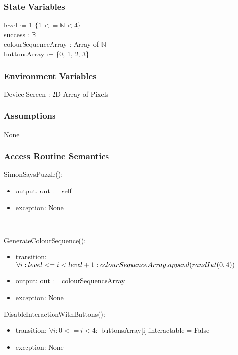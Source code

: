 \documentclass[12pt, titlepage]{article}
\begin{document}
\subsubsection{State Variables}
level := 1 $\{1<=\mathbb{N}<4\}$\\
success : $\mathds{B}$\\
colourSequenceArray : Array of $\mathds{N}$\\
buttonsArray := \{0, 1, 2, 3\}\\

\subsubsection{Environment Variables}

Device Screen : 2D Array of Pixels

\subsubsection{Assumptions}

None

\subsubsection{Access Routine Semantics}

\noindent SimonSaysPuzzle():
\begin{itemize}
\item output: out := self
\item exception: None
\end{itemize}\

\noindent GenerateColourSequence():
\begin{itemize}
\item transition: $ \forall i: level <= i < level + 1 : \newline colourSequenceArray.append(randInt(0,4))$
\item output: out := colourSequenceArray
\item exception: None
\end{itemize}

\noindent DisableInteractionWithButtons():
\begin{itemize}
\item transition: $ \forall i: 0 <= i < 4 :$ \newline buttonsArray[i].interactable = False
\item exception: None
\end{itemize}
\end{document}
